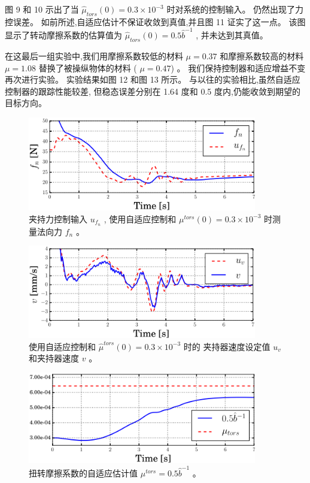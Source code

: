 图 9 和 10 示出了当
${\hat \mu _{tors}}(0) = 0.3 \times {10^{ - 3}}$ 时对系统的控制输入。
仍然出现了力控误差。
如前所述,自适应估计不保证收敛到真值,并且图 11 证实了这一点。
该图显示了转动摩擦系数的估算值为 ${\hat \mu _{tors}}(0) = 0.5{\hat b^{ - 1}}$ ,
并未达到其真值。



在这最后一组实验中,我们用摩擦系数较低的材料 $\mu = 0.37$
和摩擦系数较高的材料 $\mu = 1.08$ 替换了被操纵物体的材料 ( $\mu = 0.47$) 。
我们保持控制器和适应增益不变再次进行实验。
实验结果如图 12 和图 13 所示。
与以往的实验相比,虽然自适应控制器的跟踪性能较差,
但稳态误差分别在 1.64 度和 0.5 度内,仍能收敛到期望的目标方向。

\begin{figure}[!ht]
  \centering
  \includegraphics[width=10cm]{appendices/pic/5-6}
  \caption*{
    夹持力控制输入 $u_{f_n}$ ,
    使用自适应控制和 $\mu^{tors}(0) = 0.3 \times 10^{−3}$ 时测量法向力 $f_n$ 。}
  \vspace{-0.3cm}
\end{figure}


\begin{figure}[!ht]
  \centering
  \includegraphics[width=10cm]{appendices/pic/5-7}
  \caption*{
    使用自适应控制和 $\hat \mu^{tors}(0) = 0.3 \times 10^{−3}$ 时的
		夹持器速度设定值 $u_v$ 和夹持器速度 $v$ 。}
  \vspace{-0.3cm}
\end{figure}


\begin{figure}[!ht]
	\centering
	\includegraphics[width=10cm]{appendices/pic/5-8}
	\caption*{
     扭转摩擦系数的自适应估计值 $\mu^{tors} = 0.5 \hat b^{−1}$ 。}
	\vspace{-0.3cm}
\end{figure}


